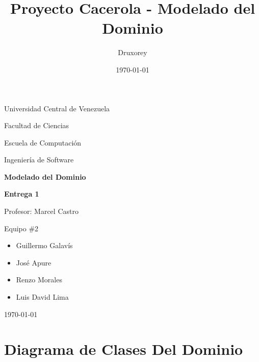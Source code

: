 \documentclass[12pt]{article}
\title{Proyecto Cacerola - Modelado del Dominio} %
\author{Druxorey} %
\date{\today} %
\begin{document}
\begin{titlepage}
	\centering
	\vspace{1cm}
	{\large {Universidad Central de Venezuela}\par}
	{\large {Facultad de Ciencias}\par}
	{\large {Escuela de Computación}\par}
	{\large {Ingeniería de Software}\par}
	\vspace{6cm}
	{\LARGE \textbf{Modelado del Dominio}\par}
	\vspace{0.25cm}
	{\Large \textbf{Entrega 1}\par}
	\vfill
	\begin{flushleft}
		{\large Profesor: Marcel Castro\par\vspace{-0.5em}}
		{\large Equipo \#2\par\vspace{-1em}}
		\begin{itemize}
			\item Guillermo Galavís\vspace{-0.5em}
			\item José Apure\vspace{-0.5em}
			\item Renzo Morales\vspace{-0.5em}
			\item Luis David Lima\vspace{-0.5em}
		\end{itemize}
	\end{flushleft}
	\vspace{0.5cm}
	\centering
	{\large \today\par}
\end{titlepage}

\section{Diagrama de Clases Del Dominio}

\vspace{1cm}
\end{document}
